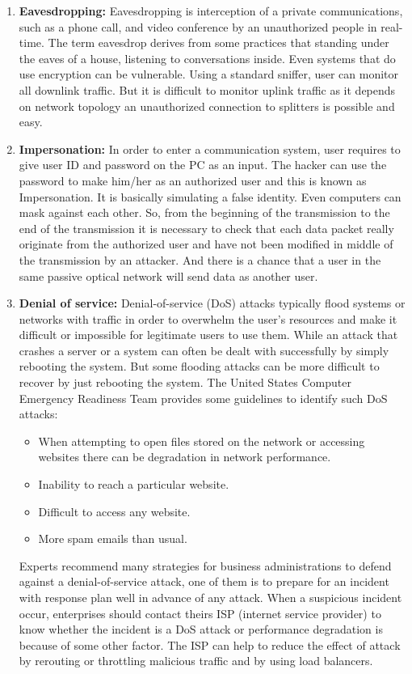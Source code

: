 \documentclass[11pt, pdftex, conference]{IEEEtran}
\begin{document}
\begin{enumerate}
\item \textbf{Eavesdropping:} Eavesdropping is interception of a private communications, such as a phone call, and video conference by an unauthorized people in real-time. The term eavesdrop derives from some practices that standing under the eaves of a house, listening to conversations inside. Even systems that do use encryption can be vulnerable. Using a standard sniffer, user can monitor all downlink traffic. But it is difficult to monitor uplink traffic as it depends on network topology an unauthorized connection to splitters is possible and easy.
\item \textbf{Impersonation:} In order to enter a communication system, user requires to give user ID and password on the PC as an input. The hacker can use the password to make him/her as an authorized user and this is known as Impersonation. It is basically simulating a false identity. Even computers can mask against each other. So, from the beginning of the transmission to the end of the transmission it is necessary to check that each data packet really originate from the authorized user and have not been modified in middle of the transmission by an attacker. 
And there is a chance that a user in the same passive optical network will send data as another user.
\item \textbf{Denial of service:} Denial-of-service (DoS) attacks typically flood systems or networks with traffic in order to overwhelm the user’s resources and make it difficult or impossible for legitimate users to use them. While an attack that crashes a server or a system can often be dealt with successfully by simply rebooting the system. But some flooding attacks can be more difficult to recover by just rebooting the system. The United States Computer Emergency Readiness Team provides some guidelines to identify such DoS attacks:
\begin{itemize}
\item When attempting to open files stored on the network or accessing websites there can be degradation in network performance.
\item Inability to reach a particular website.
\item Difficult to access any website.
\item More spam emails than usual.
\end{itemize}
Experts recommend many strategies for business administrations to defend against a denial-of-service attack, one of them is to prepare for an incident with response plan well in advance of any attack. When a suspicious incident occur, enterprises should contact theirs ISP (internet service provider) to know whether the incident is a DoS attack or performance degradation is because of some other factor. The ISP can help to reduce the effect of attack by rerouting or throttling malicious traffic and by using load balancers.

\end{enumerate}
\end{document}
